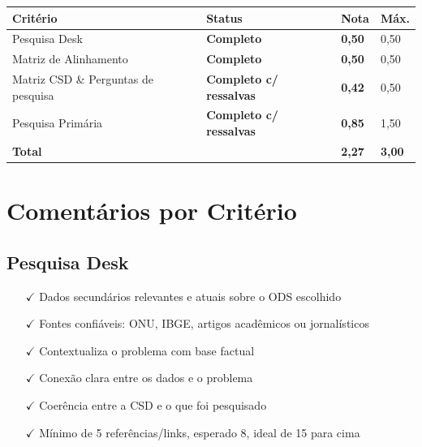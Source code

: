 \documentclass[
  sigconf,
  nonacm, %
  language=portuguese
]{acmart}
\newcommand{\statusok}[1]{{\small\bfseries\color{cgood}#1}}
\newcommand{\statuswarn}[1]{{\small\bfseries\color{cwarn}#1}}
\begin{document}
\begin{tabular}{@{} L{2.6cm} C{2.5cm} C{1.1cm} C{1.1cm} @{}}
\toprule
\textbf{Critério} & \textbf{Status} & \textbf{Nota} & \textbf{Máx.} \\
\midrule
Pesquisa Desk & \statusok{Completo} & \textbf{0,50} & 0,50 \\
Matriz de Alinhamento & \statusok{Completo} & \textbf{0,50} & 0,50 \\
Matriz CSD \& Perguntas de pesquisa & \statuswarn{Completo c/ ressalvas} & \textbf{0,42} & 0,50 \\
Pesquisa Primária & \statuswarn{Completo c/ ressalvas} & \textbf{0,85} & 1,50 \\
\midrule
\textbf{Total} & & \textbf{\color{cred}2,27} & \textbf{3,00} \\
\bottomrule
\end{tabular}

\section{Comentários por Critério}

\subsection{Pesquisa Desk}

\noindent\statusok{0,50\,/\,0,50 pts · Completo}

\begin{itemize}[leftmargin=14pt,itemsep=1pt,topsep=3pt,parsep=0pt]
  \item[\textcolor{cgood}{$\checkmark$}] {\small\textcolor{cgood}{Dados secundários relevantes e atuais sobre o ODS escolhido}}
  \item[\textcolor{cgood}{$\checkmark$}] {\small\textcolor{cgood}{Fontes confiáveis: ONU, IBGE, artigos acadêmicos ou jornalísticos}}
  \item[\textcolor{cgood}{$\checkmark$}] {\small\textcolor{cgood}{Contextualiza o problema com base factual}}
  \item[\textcolor{cgood}{$\checkmark$}] {\small\textcolor{cgood}{Conexão clara entre os dados e o problema}}
  \item[\textcolor{cgood}{$\checkmark$}] {\small\textcolor{cgood}{Coerência entre a CSD e o que foi pesquisado}}
  \item[\textcolor{cgood}{$\checkmark$}] {\small\textcolor{cgood}{Mínimo de 5 referências/links, esperado 8, ideal de 15 para cima}}
\end{itemize}
\end{document}
